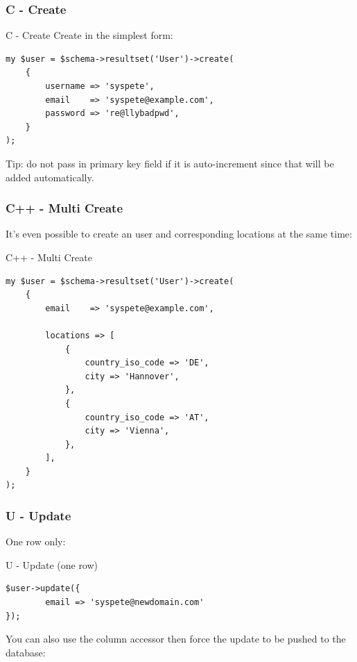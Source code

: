 \subsubsection{C - Create}
\begin{frame}[fragile]{C - Create}
Create in the simplest form:

\begin{lstlisting}
my $user = $schema->resultset('User')->create(
    {
        username => 'syspete',
        email    => 'syspete@example.com',
        password => 're@llybadpwd',
    }
);
\end{lstlisting}
\end{frame}

Tip: do not pass in primary key field if it is auto-increment since that will be added automatically.

\subsubsection{C++ - Multi Create}
It's even possible to create an user and corresponding locations at the
same time:

\begin{frame}[fragile]{C++ - Multi Create}
\begin{lstlisting}
my $user = $schema->resultset('User')->create(
    {
        email    => 'syspete@example.com',

        locations => [
            {
                country_iso_code => 'DE',
                city => 'Hannover',
            },
            {
                country_iso_code => 'AT',
                city => 'Vienna',
            },
        ],
    }
);
\end{lstlisting}
\end{frame}

\subsubsection{U - Update}

One row only:

\begin{frame}[fragile]{U - Update (one row)}
\begin{lstlisting}
$user->update({
        email => 'syspete@newdomain.com'
});
\end{lstlisting}
\end{frame}

You can also use the column accessor then force the update to be pushed to
the database:

